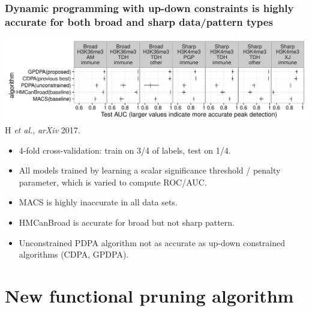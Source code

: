 \documentclass{beamer}
\begin{document}
\begin{frame}
  \frametitle{Dynamic programming with up-down constraints is highly accurate for both broad and sharp data/pattern types}
  \includegraphics[width=\textwidth]{figure-test-error-dots}
  \vskip -0.5cm
  H {\it et al.}, {\it arXiv} 2017. 
  \begin{itemize}
  \item 4-fold cross-validation: train on 3/4 of labels, test on 1/4.
  \item All models trained by learning a scalar significance
    threshold / penalty parameter, which is varied to compute ROC/AUC.
  \item MACS is highly inaccurate in all data sets.
  \item HMCanBroad is accurate for broad but not sharp pattern.
  \item Unconstrained PDPA algorithm not as accurate as up-down
    constrained algorithms (CDPA, GPDPA).
  \end{itemize}
  \scriptsize
\end{frame}

\section{New functional pruning algorithm}
\end{document}
